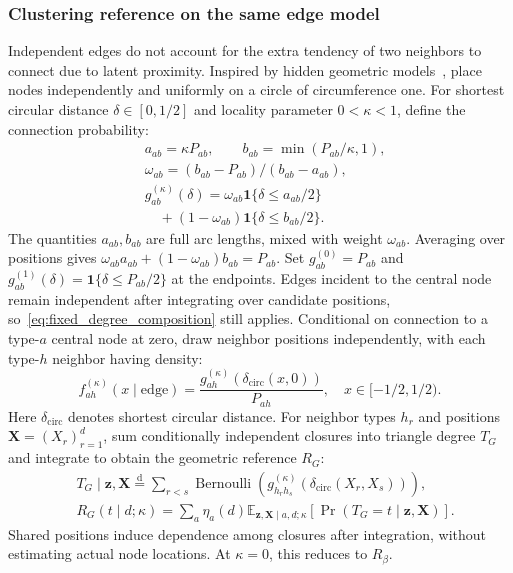\subsubsection{Clustering reference on the same edge model}
Independent edges do not account for the extra tendency of two neighbors to connect due to latent proximity. Inspired by hidden geometric models~\cite{serrano2008selfsimilarity}, place nodes independently and uniformly on a circle of circumference one. For shortest circular distance $\delta\in[0,1/2]$ and locality parameter $0<\kappa<1$, define the connection probability:
\begin{equation}
\begin{aligned}
&a_{ab}=\kappa P_{ab},\qquad b_{ab}=\min(P_{ab}/\kappa,1),\\
&\omega_{ab}=(b_{ab}-P_{ab})/(b_{ab}-a_{ab}),\\
&g_{ab}^{(\kappa)}(\delta)=\omega_{ab}\mathbf1\{\delta\le a_{ab}/2\}\\
&\quad+(1-\omega_{ab})\mathbf1\{\delta\le b_{ab}/2\}.
\end{aligned}
\label{eq:geometry_connection_kernel}
\end{equation}
The quantities $a_{ab},b_{ab}$ are full arc lengths, mixed with weight $\omega_{ab}$. Averaging over positions gives $\omega_{ab}a_{ab}+(1-\omega_{ab})b_{ab}=P_{ab}$. Set $g_{ab}^{(0)}=P_{ab}$ and $g_{ab}^{(1)}(\delta)=\mathbf1\{\delta\le P_{ab}/2\}$ at the endpoints. Edges incident to the central node remain independent after integrating over candidate positions, so~\eqref{eq:fixed_degree_composition} still applies. Conditional on connection to a type-$a$ central node at zero, draw neighbor positions independently, with each type-$h$ neighbor having density:
\begin{equation}
f_{ah}^{(\kappa)}(x\mid\mathrm{edge})=
\frac{g_{ah}^{(\kappa)}(\delta_{\mathrm{circ}}(x,0))}{P_{ah}},
\quad x\in[-1/2,1/2).
\label{eq:geometry_conditional_position}
\end{equation}
Here $\delta_{\mathrm{circ}}$ denotes shortest circular distance. For neighbor types $h_r$ and positions $\mathbf X=(X_r)_{r=1}^d$, sum conditionally independent closures into triangle degree $T_G$ and integrate to obtain the geometric reference $R_G$:
\begin{equation}
\begin{aligned}
&T_G\mid\mathbf z,\mathbf X
\overset{\mathrm d}{=}\sum_{r<s}\operatorname{Bernoulli}
\!\left(g_{h_rh_s}^{(\kappa)}(\delta_{\mathrm{circ}}(X_r,X_s))\right),\\
&R_G(t\mid d;\kappa)=\sum_a\eta_a(d)
\mathbb E_{\mathbf z,\mathbf X\mid a,d;\kappa}
[\Pr(T_G=t\mid\mathbf z,\mathbf X)].
\end{aligned}
\label{eq:geometry_conditional_reference}
\end{equation}
Shared positions induce dependence among closures after integration, without estimating actual node locations. At $\kappa=0$, this reduces to $R_\beta$.

